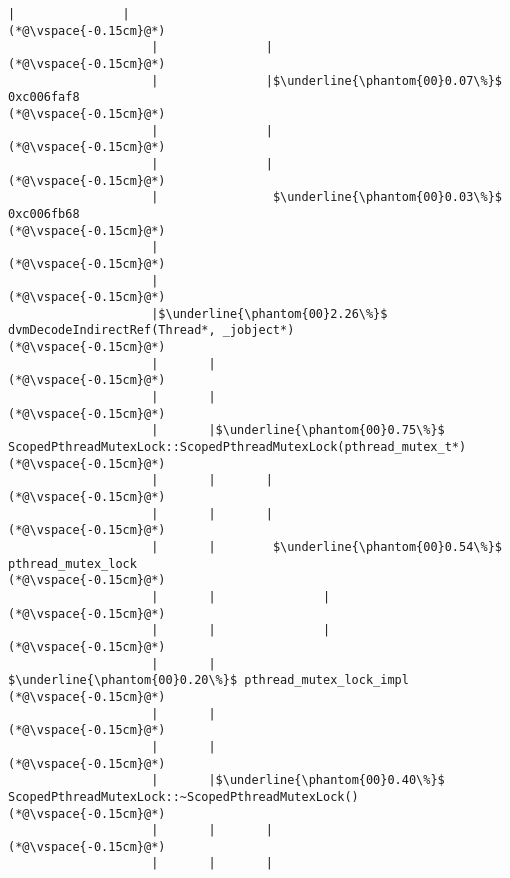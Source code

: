 \begin{lstlisting}[caption=Metodikutsu C$\to$Java 20 viiteparametrilla, label=profile:C2JBenchmark00206, numberbychapter=true, frame=lines, float, floatplacement=t]
                    |               |
(*@\vspace{-0.15cm}@*)
                    |               |
(*@\vspace{-0.15cm}@*)
                    |               |$\underline{\phantom{00}0.07\%}$ 0xc006faf8
(*@\vspace{-0.15cm}@*)
                    |               |
(*@\vspace{-0.15cm}@*)
                    |               |
(*@\vspace{-0.15cm}@*)
                    |                $\underline{\phantom{00}0.03\%}$ 0xc006fb68
(*@\vspace{-0.15cm}@*)
                    |
(*@\vspace{-0.15cm}@*)
                    |
(*@\vspace{-0.15cm}@*)
                    |$\underline{\phantom{00}2.26\%}$ dvmDecodeIndirectRef(Thread*, _jobject*)
(*@\vspace{-0.15cm}@*)
                    |       |
(*@\vspace{-0.15cm}@*)
                    |       |
(*@\vspace{-0.15cm}@*)
                    |       |$\underline{\phantom{00}0.75\%}$ ScopedPthreadMutexLock::ScopedPthreadMutexLock(pthread_mutex_t*)
(*@\vspace{-0.15cm}@*)
                    |       |       |
(*@\vspace{-0.15cm}@*)
                    |       |       |
(*@\vspace{-0.15cm}@*)
                    |       |        $\underline{\phantom{00}0.54\%}$ pthread_mutex_lock
(*@\vspace{-0.15cm}@*)
                    |       |               |
(*@\vspace{-0.15cm}@*)
                    |       |               |
(*@\vspace{-0.15cm}@*)
                    |       |                $\underline{\phantom{00}0.20\%}$ pthread_mutex_lock_impl
(*@\vspace{-0.15cm}@*)
                    |       |
(*@\vspace{-0.15cm}@*)
                    |       |
(*@\vspace{-0.15cm}@*)
                    |       |$\underline{\phantom{00}0.40\%}$ ScopedPthreadMutexLock::~ScopedPthreadMutexLock()
(*@\vspace{-0.15cm}@*)
                    |       |       |
(*@\vspace{-0.15cm}@*)
                    |       |       |

\end{lstlisting}
